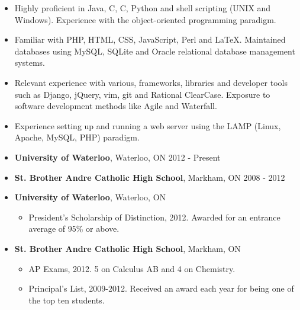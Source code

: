 \documentclass[10pt,letterpaper]{article}
\newcommand{\CPP}
{C\nolinebreak[4]\hspace{-.05em}\raisebox{.22ex}{\footnotesize\bf ++}}
\begin{document}
\begin{itemize}
\parskip=0.1em
\item Highly proficient in Java, \CPP, C, Python and shell scripting (UNIX and Windows).  Experience with the object-oriented programming paradigm.
\item Familiar with PHP, HTML, CSS, JavaScript, Perl and \LaTeX.  Maintained databases using MySQL, SQLite and Oracle relational database management systems.
\item Relevant experience with various, frameworks, libraries and developer tools such as Django, jQuery, vim, git and Rational ClearCase.  Exposure to software development methods like Agile and Waterfall.
\item Experience setting up and running a web server using the LAMP (Linux, Apache, MySQL, PHP) paradigm.
\end{itemize}

\begin{itemize}
\parskip=0.1em
\item\textbf{University of Waterloo}, Waterloo, ON \hfill 2012 - Present
\item\textbf{St. Brother Andre Catholic High School}, Markham, ON \hfill 2008 - 2012
\end{itemize}

\begin{itemize}
\parskip=0.1em
\item\textbf{University of Waterloo}, Waterloo, ON
\begin{itemize}
\item President's Scholarship of Distinction, 2012.  Awarded for an entrance average of 95\% or above.
\end{itemize}
\item\textbf{St. Brother Andre Catholic High School}, Markham, ON
\begin{itemize}
\item AP Exams, 2012.  5 on Calculus AB and 4 on Chemistry.
\item Principal's List, 2009-2012.  Received an award each year for being one of the top ten students.
\end{itemize}
\end{itemize}
\end{document}
